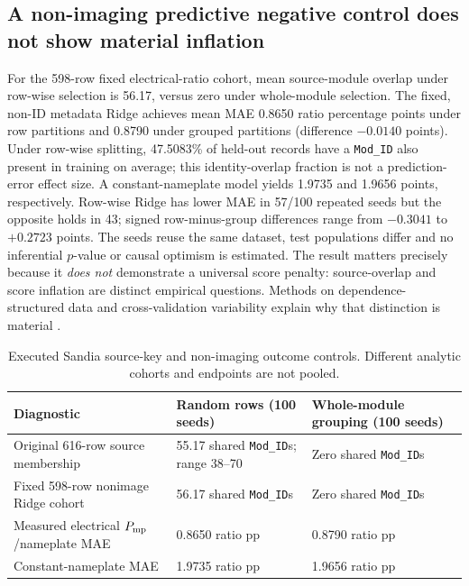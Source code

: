 \documentclass[10pt,a4paper]{article}
\begin{document}
\subsection{A non-imaging predictive negative control does not show material inflation}
For the 598-row fixed electrical-ratio cohort, mean source-module overlap under row-wise selection is 56.17, versus zero under whole-module selection. The fixed, non-ID metadata Ridge achieves mean MAE 0.8650 ratio percentage points under row partitions and 0.8790 under grouped partitions (difference $-0.0140$ points). Under row-wise splitting, 47.5083\% of held-out records have a \texttt{Mod\_ID} also present in training on average; this identity-overlap fraction is not a prediction-error effect size. A constant-nameplate model yields 1.9735 and 1.9656 points, respectively. Row-wise Ridge has lower MAE in 57/100 repeated seeds but the opposite holds in 43; signed row-minus-group differences range from $-0.3041$ to $+0.2723$ points. The seeds reuse the same dataset, test populations differ and no inferential $p$-value or causal optimism is estimated. The result matters precisely because it \emph{does not} demonstrate a universal score penalty: source-overlap and score inflation are distinct empirical questions. Methods on dependence-structured data and cross-validation variability explain why that distinction is material \cite{roberts2017,varoquaux2018}.

\begin{table}[ht]\centering\small
\caption{Executed Sandia source-key and non-imaging outcome controls. Different analytic cohorts and endpoints are not pooled.}
\begin{tabularx}{\linewidth}{@{}p{3.2cm}XX@{}}\toprule
Diagnostic & Random rows (100 seeds) & Whole-module grouping (100 seeds) \\ \midrule
Original 616-row source membership & 55.17 shared \texttt{Mod\_ID}s; range 38--70 & Zero shared \texttt{Mod\_ID}s \\
Fixed 598-row nonimage Ridge cohort & 56.17 shared \texttt{Mod\_ID}s & Zero shared \texttt{Mod\_ID}s \\
Measured electrical $P_{\rm mp}$/nameplate MAE & 0.8650 ratio pp & 0.8790 ratio pp \\
Constant-nameplate MAE & 1.9735 ratio pp & 1.9656 ratio pp \\
\bottomrule\end{tabularx}
\end{table}
\end{document}
